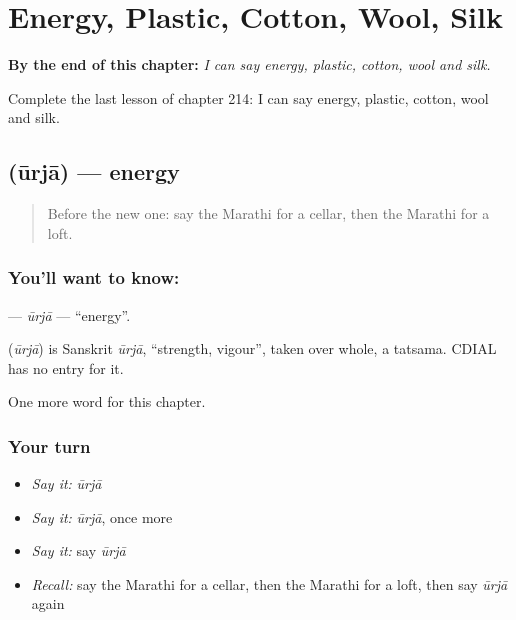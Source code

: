 
\chapter{Energy, Plastic, Cotton, Wool, Silk}
\label{ch:mr-energy-plastic-cotton-wool-silk}

\begin{chapteropening}
\textbf{By the end of this chapter:} \emph{I can say energy, plastic, cotton, wool and silk.}

Complete the last lesson of chapter 214: I can say energy, plastic, cotton, wool and silk.
\end{chapteropening}

\section[\texorpdfstring{\mr{ऊर्जा} (ūrjā)}{ऊर्जा (ūrjā)}]{ (ūrjā) — energy}

\label{lesson:MR-C214-urja}



\begin{quote}
Before the new one: say the Marathi for a cellar, then the Marathi for a loft.
\end{quote}

\subsection*{You'll want to know: }
\textbf{} — \emph{ūrjā} — \textquotedblleft{}energy\textquotedblright{}.

\begin{cousinweb}
\textbf{} (\emph{ūrjā}) is Sanskrit \emph{ūrjā}, \textquotedblleft{}strength, vigour\textquotedblright{}, taken over whole, a tatsama. CDIAL has no entry for it.
\end{cousinweb}

\begin{grammarlens}[title={What you've built}]
One more word for this chapter.
\end{grammarlens}

\subsection*{Your turn}
\begin{itemize}
\raggedright
  \item \emph{Say it:} \emph{ūrjā}
  \item \emph{Say it:} \emph{ūrjā}, once more
  \item \emph{Say it:} say \emph{ūrjā}
  \item \emph{Recall:} say the Marathi for a cellar, then the Marathi for a loft, then say \emph{ūrjā} again
\end{itemize}

